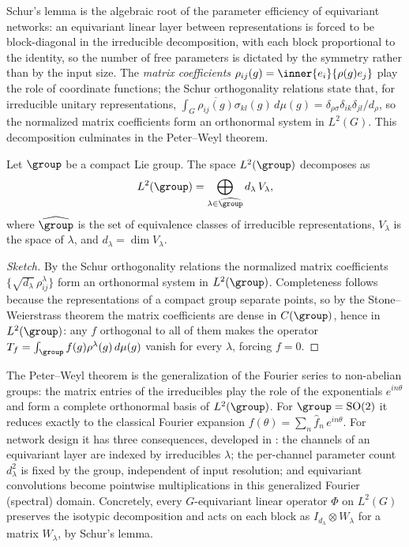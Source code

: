 Schur's lemma is the algebraic root of the parameter efficiency of equivariant
networks: an equivariant linear layer between representations is forced to be
block-diagonal in the irreducible decomposition, with each block proportional to
the identity, so the number of free parameters is dictated by the symmetry rather
than by the input size. The \emph{matrix coefficients} $\rho_{ij}(g) =
\inner{e_i}{\rho(g)e_j}$ play the role of coordinate functions; the Schur
orthogonality relations state that, for irreducible unitary representations,
$\int_G \overline{\rho_{ij}(g)}\sigma_{kl}(g)\, d\mu(g) = \delta_{\rho\sigma}
\delta_{ik}\delta_{jl}/d_\rho$, so the normalized matrix coefficients form an
orthonormal system in $L^2(G)$. This decomposition culminates in the
Peter--Weyl theorem.

\begin{theorem}
\label{thm:found:peterweyl}
Let $\group$ be a compact Lie group. The space $L^2(\group)$ decomposes as
\[
  L^2(\group) = \bigoplus_{\lambda \in \widehat{\group}} d_\lambda\, V_\lambda,
\]
where $\widehat{\group}$ is the set of equivalence classes of irreducible
representations, $V_\lambda$ is the space of $\lambda$, and $d_\lambda = \dim
V_\lambda$.
\end{theorem}

\begin{proof}[Sketch]
By the Schur orthogonality relations the normalized matrix coefficients
$\{\sqrt{d_\lambda}\,\rho^\lambda_{ij}\}$ form an orthonormal system in
$L^2(\group)$. Completeness follows because the representations of a compact
group separate points, so by the Stone--Weierstrass theorem the matrix
coefficients are dense in $C(\group)$, hence in $L^2(\group)$: any $f$ orthogonal
to all of them makes the operator $T_f = \int_\group f(g)\rho^\lambda(g)\,d\mu(g)$
vanish for every $\lambda$, forcing $f = 0$.
\end{proof}

The Peter--Weyl theorem is the generalization of the Fourier series to
non-abelian groups: the matrix entries of the irreducibles play the role of the
exponentials $e^{in\theta}$ and form a complete orthonormal basis of
$L^2(\group)$. For $\group = \SO(2)$ it reduces exactly to the classical Fourier
expansion $f(\theta) = \sum_n \hat f_n\,e^{in\theta}$. For network design it has
three consequences, developed in : the channels of an
equivariant layer are indexed by irreducibles $\lambda$; the per-channel
parameter count $d_\lambda^2$ is fixed by the group, independent of input
resolution; and equivariant convolutions become pointwise multiplications in this
generalized Fourier (spectral) domain. Concretely, every $G$-equivariant linear
operator $\Phi$ on $L^2(G)$ preserves the isotypic decomposition and acts on each
block as $I_{d_\lambda} \otimes W_\lambda$ for a matrix $W_\lambda$, by Schur's
lemma.

